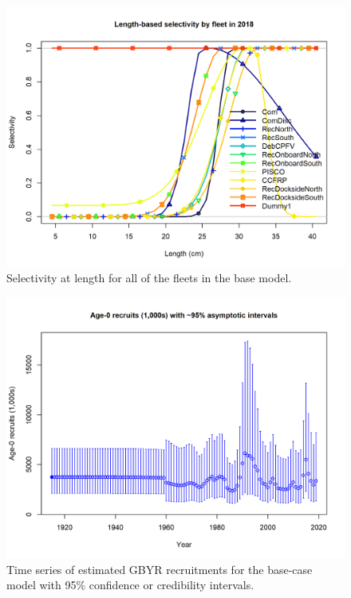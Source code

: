 \documentclass[12pt,]{article}
\begin{document}
\FloatBarrier

\FloatBarrier

\FloatBarrier

\FloatBarrier

\begin{figure}
\centering
\includegraphics{r4ss/plots_mod1/sel01_multiple_fleets_length1.png}
\caption{Selectivity at length for all of the fleets in the base model.
\label{fig:sel01_multiple_fleets_length1}}
\end{figure}

\FloatBarrier

\begin{figure}
\centering
\includegraphics{r4ss/plots_mod1/ts11_Age-0_recruits_(1000s)_with_95_asymptotic_intervals.png}
\caption{Time series of estimated GBYR recruitments for the base-case
model with 95\% confidence or credibility intervals.
\label{fig:Recruit_mod1}}
\end{figure}
\end{document}
